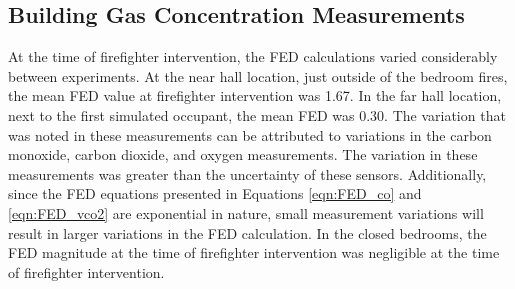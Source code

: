 \documentclass[12pt,oneside]{book}
\begin{document}

\subsection{Building Gas Concentration Measurements}
At the time of firefighter intervention, the FED calculations varied considerably between experiments. At the near hall location, just outside of the bedroom fires,  the mean FED value at firefighter intervention was 1.67. In the far hall location, next to the first simulated occupant, the mean FED was 0.30. The variation that was noted in these measurements can be attributed to variations in the carbon monoxide, carbon dioxide, and oxygen measurements. The variation in these measurements was greater than the uncertainty of these sensors. Additionally, since the FED equations presented in Equations \ref{eqn:FED_co} and \ref{eqn:FED_vco2} are exponential in nature, small measurement variations will result in larger variations in the FED calculation. In the closed bedrooms, the FED magnitude at the time of firefighter intervention was negligible at the time of firefighter intervention. 
\end{document}

